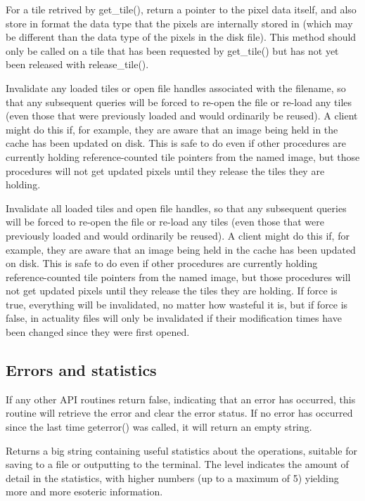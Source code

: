 For a tile retrived by {\cf get_tile()}, return a pointer to the
pixel data itself, and also store in {\cf format} the data type that
the pixels are internally stored in (which may be different than
the data type of the pixels in the disk file).  This method should
only be called on a tile that has been requested by 
{\cf get_tile()} but has not yet been released with {\cf release_tile()}.
\apiend

Invalidate any loaded tiles or open file handles associated with
the filename, so that any subsequent queries will be forced to
re-open the file or re-load any tiles (even those that were
previously loaded and would ordinarily be reused).  A client
might do this if, for example, they are aware that an image
being held in the cache has been updated on disk.  This is safe
to do even if other procedures are currently holding 
reference-counted tile pointers from the named image, but those 
procedures will not get updated pixels until they release the 
tiles they are holding.
\apiend

Invalidate all loaded tiles and open file handles, so that any
subsequent queries will be forced to re-open the file or re-load any
tiles (even those that were previously loaded and would ordinarily be
reused).  A client might do this if, for example, they are aware that an
image being held in the cache has been updated on disk.  This is safe to
do even if other procedures are currently holding reference-counted tile
pointers from the named image, but those procedures will not get updated
pixels until they release the tiles they are holding.  If force is true,
everything will be invalidated, no matter how wasteful it is, but if
force is false, in actuality files will only be invalidated if their
modification times have been changed since they were first opened.
\apiend

\subsection{Errors and statistics}
\label{sec:imagecache:api:geterror}
\label{sec:imagecache:api:getstats}

If any other API routines return {\cf false}, indicating that an error
has occurred, this routine will retrieve the error and clear the error
status.  If no error has occurred since the last time {\cf geterror()}
was called, it will return an empty string.
\apiend

Returns a big string containing useful statistics about the \ImageCache
operations, suitable for saving to a file or outputting to the terminal.
The {\cf level} indicates the amount of detail in the statistics,
with higher numbers (up to a maximum of 5) yielding more and more
esoteric information.
\apiend



\chapwidthend
